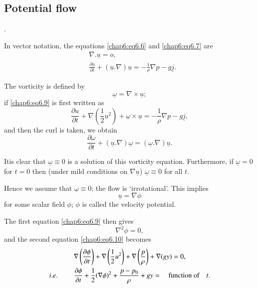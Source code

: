 \subsection*{\bf Potential flow}.

In vector notation, the equations \eqref{chap6:eq6.6} and \eqref{chap6:eq6.7} are 
\begin{align}
& \nabla.\underline{u}=o,\tag{6.9}\label{chap6:eq6.9}\\
& \frac{\partial\underline{u}}{\partial t}+(\underline{u}.\nabla)\underline{u} = -\frac{1}{\rho}\nabla p-g\underline{j}.\tag{6.10}\label{chap6:eq6.10}
\end{align}

The vorticity is defined by 
\begin{equation}
\underline{\omega}=\nabla\times\underline{u};\tag{6.11}\label{chap6:eq6.11}
\end{equation}
if \eqref{chap6:eq6.9} is first written as 
\begin{equation}
\frac{\partial u}{\partial t}+\nabla\left(\frac{1}{2}\underline{u}^2\right)+ \underline{\omega}\times\underline{u}=-\frac{1}{\rho}\nabla p-g\underline{j}, \tag{6.12}\label{chap6:eq6.12}
\end{equation}
and then the curl is taken, we obtain
\begin{equation}
\frac{\partial\omega}{\partial t}+(\underline{u}.\nabla)\underline{\omega}= (\underline{\omega}.\nabla)\underline{u}.\tag{6.13}\label{chap6:eq6.13}
\end{equation}

It\pageoriginale is clear that $\underline{\omega}\equiv 0$ is a solution of this vorticity equation. Furthermore, if $\underline{\omega}=0$ for $t=0$ then (under mild conditions on $\nabla\underline{u}$) $\underline{\omega}\equiv 0$ for all $t$. 

Hence we assume that $\underline{\omega}\equiv 0$; \ie the flow is `irrotational'. This implies 
\begin{equation}
\underline{u}=\nabla\phi\tag{6.14}\label{chap6:eq6.14}
\end{equation}
for some scalar field $\phi$; $\phi$ is called the velocity potential.

The first equation \eqref{chap6:eq6.9} then gives 
\begin{equation}
\nabla^2\phi=0,\tag{6.15}\label{chap6:eq6.15}
\end{equation}
and the second equation \eqref{chap6:eq6.10} becomes
\begin{align*}
&\nabla\left(\frac{\partial\phi}{\partial t}\right)+\nabla\left( \frac{1}{2}u^2\right)+\nabla\left(\frac{p}{\rho}\right)+ \nabla(gy)=0,\\
{i.e.}\kern.3em\qquad &\frac{\partial\phi}{\partial t}+\frac{1}{2}(\nabla\phi)^2+ \frac{p-p_0}{\rho}+gy=\quad\text{function of}\quad t.
\end{align*}

